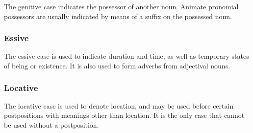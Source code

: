 \documentclass[grammar]{subfiles}
\begin{document}
The genitive case indicates the possessor of another noun.  Animate pronomial
possessors are usually indicated by means of a suffix on the possessed noun.


\subsubsection{Essive}
\label{sssec:ns_essive_case}
 
The essive case is used to indicate duration and time, as well as temporary
states of being or existence.  It is also used to form adverbs from adjectival
nouns.
 
 
\subsubsection{Locative}
\label{sssec:ns_locative_case}
 
The locative case is used to denote location, and may be used before certain
postpositions with meanings other than location.  It is the only case that
cannot be used without a postposition.

% 
% 
% 
% 
% 
% 
% 
% 
% 
% 
% 
% 
% 
% 
% 
% 
% 
% 
\end{document}
